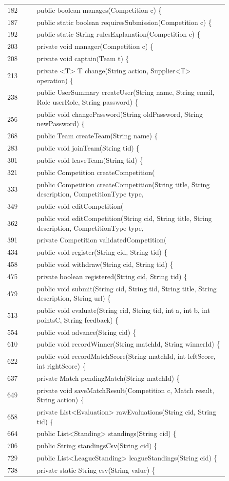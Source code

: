 \begin{longtable}{p{0.12\linewidth}p{0.78\linewidth}}
182 & public boolean manages(Competition c) \{\\
187 & public static boolean requiresSubmission(Competition c) \{\\
192 & public static String rulesExplanation(Competition c) \{\\
203 & private void manager(Competition c) \{\\
208 & private void captain(Team t) \{\\
213 & private <T> T change(String action, Supplier<T> operation) \{\\
238 & public UserSummary createUser(String name, String email, Role userRole, String password) \{\\
256 & public void changePassword(String oldPassword, String newPassword) \{\\
268 & public Team createTeam(String name) \{\\
283 & public void joinTeam(String tid) \{\\
301 & public void leaveTeam(String tid) \{\\
321 & public Competition createCompetition(\\
333 & public Competition createCompetition(String title, String description, CompetitionType type,\\
349 & public void editCompetition(\\
362 & public void editCompetition(String cid, String title, String description, CompetitionType type,\\
391 & private Competition validatedCompetition(\\
434 & public void register(String cid, String tid) \{\\
458 & public void withdraw(String cid, String tid) \{\\
475 & private boolean registered(String cid, String tid) \{\\
479 & public void submit(String cid, String tid, String title, String description, String url) \{\\
513 & public void evaluate(String cid, String tid, int a, int b, int pointsC, String feedback) \{\\
554 & public void advance(String cid) \{\\
610 & public void recordWinner(String matchId, String winnerId) \{\\
622 & public void recordMatchScore(String matchId, int leftScore, int rightScore) \{\\
637 & private Match pendingMatch(String matchId) \{\\
649 & private void saveMatchResult(Competition c, Match result, String action) \{\\
658 & private List<Evaluation> rawEvaluations(String cid, String tid) \{\\
664 & public List<Standing> standings(String cid) \{\\
706 & public String standingsCsv(String cid) \{\\
729 & public List<LeagueStanding> leagueStandings(String cid) \{\\
738 & private static String csv(String value) \{\\
\bottomrule\end{longtable}
